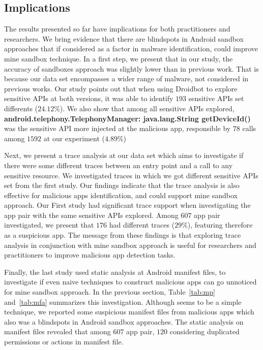 \subsection{Implications}\label{sec:implications}

The results presented so far have implications for both practitioners and researchers. We bring evidence that there are blindspots in Android sandbox approaches that if considered as a factor in malware identification, could improve mine sandbox technique. In a first step, we present that in our study, the accuracy of sandboxes approach was slightly lower than in previous work. That is because our data set encompasses a wider range of malware, not considered in previous works. Our study points out that when using Droidbot to explore sensitive APIs at both versions, it was able to identify $193$ sensitive APIs set differents ($24.12$\%). We also show that among all sensitive APIs explored, \textbf{android.telephony.TelephonyManager: java.lang.String getDeviceId()} was the sensitive API more injected at the malicious app, responsible by $78$ calls among $1592$ at our experiment ($4.89\%$)

Next, we present a trace analysis at our data set which aims to investigate if there were some different traces between an entry point and a call to any sensitive resource. We investigated traces in which we got different sensitive APIs set from the first study. Our findings indicate that the trace analysis is also effective for malicious apps identification, and could support mine sandbox approach. Our First study had significant trace support when investigating the app pair with the same sensitive APIs explored. Among $607$ app pair investigated, we present that $176$ had different traces ($29\%$), featuring therefore as a suspicious app. The message from these findings is that exploring trace analysis in conjunction with mine sandbox approach is useful for researchers and practitioners to improve malicious app detection tasks. 

Finally, the last study used static analysis at Android manifest files, to investigate if even naive techniques to construct malicious apps can go unnoticed for mine sandbox approach. In the previous section, Table~\ref{tab:mp} and~\ref{tab:mfa} summarizes this investigation. Although seems to be a simple technique, we reported some suspicious manifest files from malicious apps which also was a blindspots in Android sandbox approaches. The static analysis on manifest files revealed that among $607$ app pair, $120$ considering duplicated permissions or actions in manifest file.

